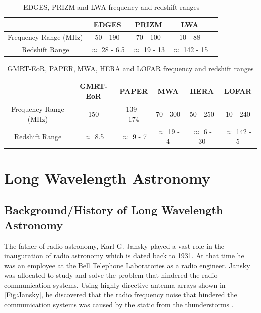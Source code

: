 \documentclass[12pt,a4paper]{report}
\begin{document}
\begin{table}[h!]
	\centering
	\begin{tabular}{|c | c | c | c| c|} 
		\hline
		 & EDGES &  PRIZM & LWA \\ [0.5ex] 
		\hline
		Frequency Range (MHz) & 50 - 190 & 70 - 100 & 10 - 88\\
		\hline
		Redshift Range & $\approx$ 28 - 6.5 & $\approx$ 19 - 13 & $\approx$ 142 - 15 \\
		\hline
		\end{tabular}
	\caption{EDGES, PRIZM and LWA frequency and redshift ranges}
	\label{table:range}
\end{table}
	
\begin{table}[h!]
	\centering
	\begin{tabular}{|c | c | c | c | c | c |} 
		\hline
		& GMRT-EoR &  PAPER & MWA & HERA & LOFAR\\ [0.5ex] 
		\hline
		Frequency Range (MHz) & 150 & 139 - 174 & 70 - 300 & 50 - 250 & 10 - 240\\
		\hline
		Redshift Range & $\approx$ 8.5 & $\approx$ 9 - 7 & $\approx$ 19 - 4 & $\approx$ 6 - 30 & $\approx$ 142 - 5 \\
		\hline
	\end{tabular}
	\caption{GMRT-EoR, PAPER, MWA, HERA and LOFAR frequency and redshift ranges}
	\label{table:range1}
\end{table}
	
	
\section{Long Wavelength Astronomy}
\subsection{Background/History of Long Wavelength Astronomy}
	The father of radio astronomy, Karl G. Jansky played a vast role in the inauguration of radio astronomy which is dated back to 1931. At that time he was an employee at the Bell Telephone Laboratories as a radio engineer. Jansky was allocated to study and solve the problem that hindered the radio communication systems. Using highly directive antenna arrays shown in \autoref{Fig:Jansky}, he discovered that the radio frequency noise that hindered the communication systems was caused by the static from the thunderstorms \cite{book:BasicsofRA,book:RA}. \\
	
\end{document}
